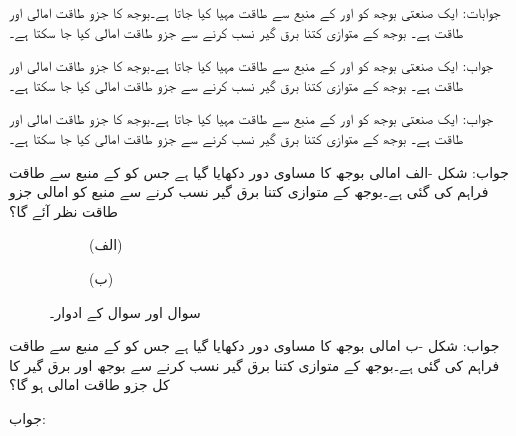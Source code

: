 جوابات: 
ایک صنعتی بوجھ کو  اور  کے منبع سے طاقت مہیا کیا جاتا ہے۔بوجھ کا جزو طاقت  امالی اور طاقت  ہے۔ بوجھ کے متوازی کتنا برق گیر نسب کرنے سے جزو طاقت  امالی کیا جا سکتا ہے۔

جواب:
ایک صنعتی بوجھ کو  اور  کے منبع سے طاقت مہیا کیا جاتا ہے۔بوجھ کا جزو طاقت  امالی اور طاقت  ہے۔ بوجھ کے متوازی کتنا برق گیر نسب کرنے سے جزو طاقت  امالی کیا جا سکتا ہے۔

جواب:
ایک صنعتی بوجھ کو  اور  کے منبع سے طاقت مہیا کیا جاتا ہے۔بوجھ کا جزو طاقت  امالی اور طاقت  ہے۔ بوجھ کے متوازی کتنا برق گیر نسب کرنے سے جزو طاقت  امالی کیا جا سکتا ہے۔

جواب:
شکل -الف امالی بوجھ کا مساوی دور  دکھایا گیا ہے جس کو  کے منبع سے طاقت فراہم کی گئی ہے۔بوجھ کے متوازی کتنا برق گیر نسب کرنے سے منبع کو  امالی جزو طاقت نظر آئے گا؟
\begin{figure}
\centering
\begin{subfigure}{0.5\textwidth}
\centering
{}
\caption*{(الف)}
\end{subfigure}%
\begin{subfigure}{0.5\textwidth}
\centering
{}
\caption*{(ب)}
\end{subfigure}%
\caption{سوال  اور سوال  کے ادوار۔}
\label{شکل_سوال_طاقت_مساوی_الف}
\end{figure}

جواب:
شکل -ب امالی بوجھ کا مساوی دور  دکھایا گیا ہے جس کو  کے منبع سے طاقت فراہم کی گئی ہے۔بوجھ کے متوازی کتنا برق گیر نسب کرنے سے  بوجھ اور برق گیر کا کل جزو طاقت  امالی ہو گا؟

جواب:
